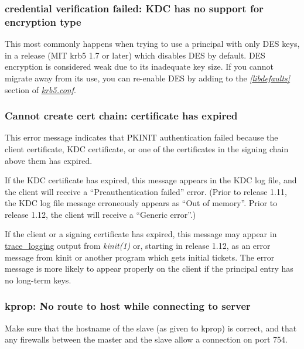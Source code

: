 \documentclass[letterpaper,10pt,english]{sphinxmanual}
\begin{document}
\subsubsection{credential verification failed: KDC has no support for encryption type}
\label{admin/troubleshoot:credential-verification-failed-kdc-has-no-support-for-encryption-type}\label{admin/troubleshoot:cert-chain-etype-nosupp}
This most commonly happens when trying to use a principal with only
DES keys, in a release (MIT krb5 1.7 or later) which disables DES by
default.  DES encryption is considered weak due to its inadequate key
size.  If you cannot migrate away from its use, you can re-enable DES
by adding  to the {\hyperref[admin/conf_files/krb5_conf:libdefaults]{\emph{{[}libdefaults{]}}}}
section of {\hyperref[admin/conf_files/krb5_conf:krb5-conf-5]{\emph{krb5.conf}}}.


\subsubsection{Cannot create cert chain: certificate has expired}
\label{admin/troubleshoot:cannot-create-cert-chain-certificate-has-expired}\label{admin/troubleshoot:err-cert-chain-cert-expired}
This error message indicates that PKINIT authentication failed because
the client certificate, KDC certificate, or one of the certificates in
the signing chain above them has expired.

If the KDC certificate has expired, this message appears in the KDC
log file, and the client will receive a ``Preauthentication failed''
error.  (Prior to release 1.11, the KDC log file message erroneously
appears as ``Out of memory''.  Prior to release 1.12, the client will
receive a ``Generic error''.)

If the client or a signing certificate has expired, this message may
appear in {\hyperref[admin/troubleshoot:trace-logging]{trace\_logging}} output from \emph{kinit(1)} or, starting in
release 1.12, as an error message from kinit or another program which
gets initial tickets.  The error message is more likely to appear
properly on the client if the principal entry has no long-term keys.


\subsubsection{kprop: No route to host while connecting to server}
\label{admin/troubleshoot:kprop-no-route}\label{admin/troubleshoot:kprop-no-route-to-host-while-connecting-to-server}
Make sure that the hostname of the slave (as given to kprop) is
correct, and that any firewalls between the master and the slave allow
a connection on port 754.
\end{document}
